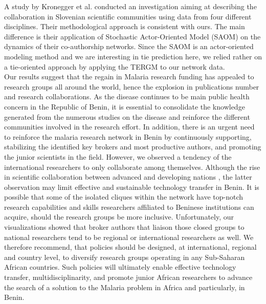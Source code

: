 A study by Kronegger et al. \cite{kronegger_collaboration_2012} conducted an investigation aiming at describing the collaboration in Slovenian scientific communities using data from four different disciplines. Their methodological approach is consistent with ours. The main difference is their application of Stochastic Actor-Oriented Model (SAOM) on the dynamics of their co-authorship networks. Since the SAOM is an actor-oriented modeling method and we are interesting in tie prediction here, we relied rather on a tie-oriented approach by applying the TERGM to our network data. \\
Our results suggest that the regain in Malaria research funding has appealed to research groups all around the world, hence the explosion in publications number and research collaborations. 
As the disease continues to be main public health concern in the Republic of Benin, it is essential to consolidate the knowledge generated from the numerous studies on the disease and reinforce the different  communities involved in the research effort. In addition, there is an urgent need to reinforce the malaria research network in Benin by continuously supporting, stabilizing the identified key brokers and most productive authors, and promoting the junior scientists in the field. However, we observed a tendency of the international researchers to only collaborate among themselves. Although the rise in scientific collaboration between advanced and developing nations \cite{wagner_science_2001}, the latter observation may limit effective and sustainable technology transfer in Benin. It is possible that some of the isolated cliques within the network have top-notch research capabilities and skills researchers affiliated to Beninese institutions can acquire, should the research groups be more inclusive. Unfortunately, our visualizations showed that broker authors that liaison those closed groups to national researchers tend to be regional or international researchers as well. We therefore recommend, that policies should be designed, at international, regional and country level, to diversify research groups operating in any Sub-Saharan African countries. Such policies will ultimately enable effective technology transfer, multidisciplinarity, and promote junior African researchers to advance the search of a solution to the Malaria problem in Africa and particularly, in Benin.


